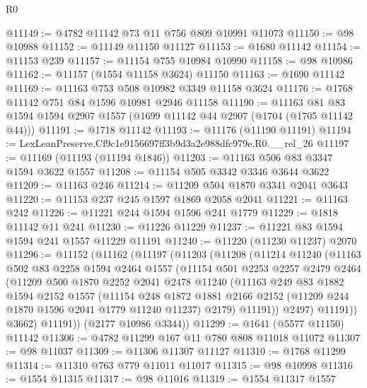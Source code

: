 \begin{lexlean}{R0}
\begin{coremodule}
@11149 := @4782 @11142 @73 @11 @756 @809 @10991 @11073
@11150 := @98 @10988
@11152 := @11149 @11150 @11127
@11153 := @1680 @11142
@11154 := @11153 @239
@11157 := @11154 @755 @10984 @10990
@11158 := @98 @10986
@11162 := @11157 (@1554 @11158 @3624) @11150
@11163 := @1690 @11142
@11169 := @11163 @753 @508 @10982 @3349 @11158 @3624
@11176 := @1768 @11142 @751 @84 @1596 @10981 @2946 @11158
@11190 := @11163 @81 @83 @1594 @1594 @2907 @1557 (@1699 @11142 @44 @2907 (@1704 (@1705 @11142 @44)))
@11191 := @1718 @11142
@11193 := @11176 (@11190 @11191)
@11194 := LexLeanPreserve.Cf9c1e9156697ff3b9d3a2e988dfc979e.R0.__rel_26
@11197 := @11169 (@11193 (@11194 @1846))
@11203 := @11163 @506 @83 @3347 @1594 @3622 @1557
@11208 := @11154 @505 @3342 @3346 @3644 @3622
@11209 := @11163 @246
@11214 := @11209 @504 @1870 @3341 @2041 @3643
@11220 := @11153 @237 @245 @1597 @1869 @2058 @2041
@11221 := @11163 @242
@11226 := @11221 @244 @1594 @1596 @241 @1779
@11229 := @1818 @11142 @11 @241
@11230 := @11226 @11229
@11237 := @11221 @83 @1594 @1594 @241 @1557 @11229 @11191
@11240 := @11220 (@11230 @11237) @2070
@11296 := @11152
    (@11162
      (@11197
        (@11203
          (@11208
            (@11214
              @11240
              (@11163
                @502
                @83
                @2258
                @1594
                @2464
                @1557
                (@11154
                  @501
                  @2253
                  @2257
                  @2479
                  @2464
                  (@11209
                    @500
                    @1870
                    @2252
                    @2041
                    @2478
                    @11240
                    (@11163
                      @249
                      @83
                      @1882
                      @1594
                      @2152
                      @1557
                      (@11154
                        @248
                        @1872
                        @1881
                        @2166
                        @2152
                        (@11209 @244 @1870 @1596 @2041 @1779 @11240 @11237)
                        @2179)
                      @11191))
                  @2497)
                @11191))
            @3662)
          @11191))
      (@2177 @10986 @3344))
@11299 := @1641 (@5577 @11150) @11142
@11306 := @4782 @11299 @167 @11 @780 @808 @11018 @11072
@11307 := @98 @11037
@11309 := @11306 @11307 @11127
@11310 := @1768 @11299
@11314 := @11310 @763 @779 @11011 @11017
@11315 := @98 @10998
@11316 := @1554 @11315
@11317 := @98 @11016
@11319 := @1554 @11317 @1557

\end{coremodule}
\end{lexlean}

